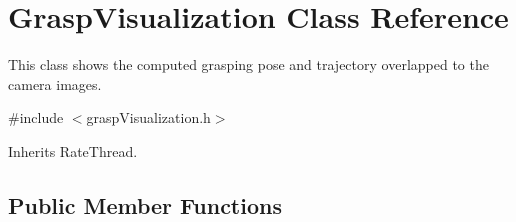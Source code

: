 \section{Grasp\+Visualization Class Reference}
\label{classGraspVisualization}


This class shows the computed grasping pose and trajectory overlapped to the camera images.  




{\ttfamily \#include $<$grasp\+Visualization.\+h$>$}



Inherits Rate\+Thread.

\subsection*{Public Member Functions}
